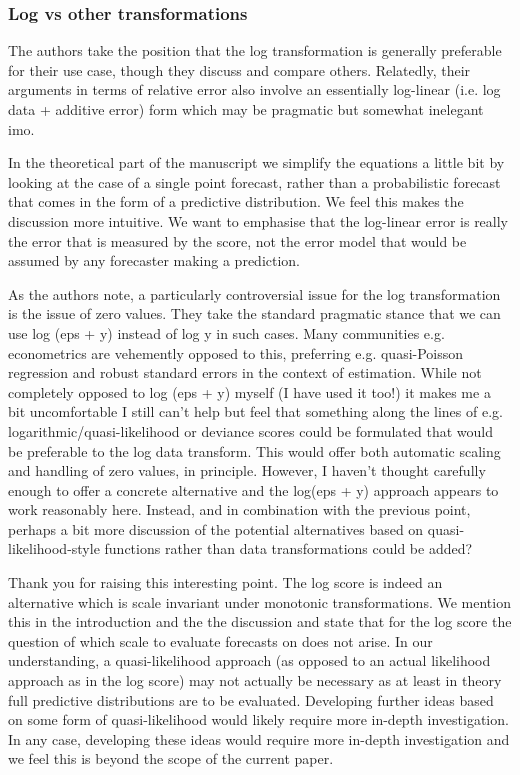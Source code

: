 \documentclass{article}
\newcommand{\black}{\color{black}}
\newcommand{\blue}{\color{blue}}
\newcommand{\notindented}{\setlength{\leftskip}{0cm}}
\begin{document}
\notindented

\blue
\subsubsection{Log vs other transformations}
The authors take the position that the log transformation is generally preferable for their use case, though they discuss and compare others. Relatedly, their arguments in terms of relative error also involve an essentially log-linear (i.e. log data + additive error) form which may be pragmatic but somewhat inelegant imo.

\black
In the theoretical part of the manuscript we simplify the equations a little bit by looking at the case of a single point forecast, rather than a probabilistic forecast that comes in the form of a predictive distribution. We feel this makes the discussion more intuitive. We want to emphasise that the log-linear error is really the error that is measured by the score, not the error model that would be assumed by any forecaster making a prediction. 


\blue
As the authors note, a particularly controversial issue for the log transformation is the issue of zero values. They take the standard pragmatic stance that we can use log (eps + y) instead of log y in such cases. Many communities e.g. econometrics are vehemently opposed to this, preferring e.g. quasi-Poisson regression and robust standard errors in the context of estimation. While not completely opposed to log (eps + y) myself (I have used it too!) it makes me a bit uncomfortable I still can’t help but feel that something along the lines of e.g. logarithmic/quasi-likelihood or deviance scores could be formulated that would be preferable to the log data transform. This would offer both automatic scaling and handling of zero values, in principle. However, I haven’t thought carefully enough to offer a concrete alternative and the log(eps + y) approach appears to work reasonably here. Instead, and in combination with the previous point, perhaps a bit more discussion of the potential alternatives based on quasi-likelihood-style functions rather than data transformations could be added?

\black
Thank you for raising this interesting point. The log score is indeed an alternative which is scale invariant under monotonic transformations. We mention this in the introduction and the the discussion and state that for the log score the question of which scale to evaluate forecasts on does not arise. In our understanding, a quasi-likelihood approach (as opposed to an actual likelihood approach as in the log score) may not actually be necessary as at least in theory full predictive distributions are to be evaluated. Developing further ideas based on some form of quasi-likelihood would likely require more in-depth investigation. In any case, developing these ideas would require more in-depth investigation and we feel this is beyond the scope of the current paper. 
\end{document}
